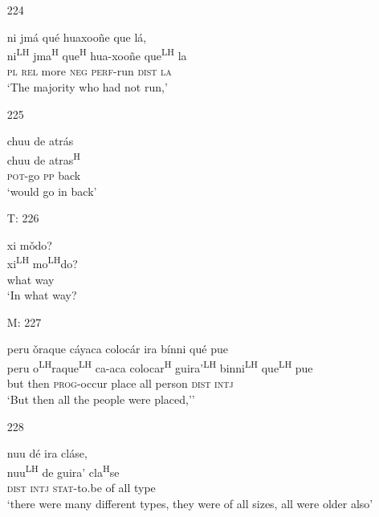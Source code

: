 \begin{itemize}
\item[224]
 
\glll  ni jm\'{a} qu\'{e} huaxoo\~{n}e que l\'{a}, \\
ni\textsuperscript{LH} jma\textsuperscript{H} que\textsuperscript{H} hua-xoo\~{n}e que\textsuperscript{LH} la\\
\textsc{pl} \textsc{rel} more \textsc{neg}  \textsc{perf}-run \textsc{dist} \textsc{la}\\
\glt `The majority who had not run,'
 


\item[225]
 
\glll   chuu de atr\'{a}s\\
chuu de atras\textsuperscript{H}\\
  \textsc{pot}-go \textsc{pp} back\\
\glt `would go in back'
 


\item[T: 226]
 
\glll   xi m\v{o}do?\\
xi\textsuperscript{LH} mo\textsuperscript{LH}do?\\
what way\\
\glt `In what way?
 


\item[M: 227]
 
\glll   peru \v{o}raque c\'{a}yaca coloc\'{a}r ira b\'{i}nni qu\'{e} pue\\
 peru o\textsuperscript{LH}raque\textsuperscript{LH} ca-aca colocar\textsuperscript{H} guira'\textsuperscript{LH} binni\textsuperscript{LH}  que\textsuperscript{LH} pue\\
 but then \textsc{prog}-occur place all person \textsc{dist} \textsc{intj} \\
\glt `But then all the people were placed,''
 



\item[228]
 
\glll   nuu d\'{e} ira cl\'{a}se, \\
nuu\textsuperscript{LH} de guira' cla\textsuperscript{H}se\\
\textsc{dist} \textsc{intj} \textsc{stat}-to.be of all type\\
\glt `there were many different types, they were of all sizes, all were older also'
 




\end{itemize}
